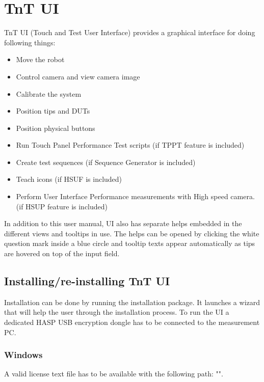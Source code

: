 \chapter{TnT UI}
\label{ch:ui}

TnT UI (Touch and Test User Interface) provides a graphical interface for doing following things:

\begin{itemize}
	\item Move the robot
	\item Control camera and view camera image
	\item Calibrate the system
	\item Position tips and DUTs
	\item Position physical buttons
	\item Run Touch Panel Performance Test scripts (if TPPT feature is included)
	\item Create test sequences (if Sequence Generator is included)
	\item Teach icons (if HSUF is included)
	\item Perform User Interface Performance measurements with High speed camera. (if HSUP feature is included)
\end{itemize}

In addition to this user manual, UI also has separate helps embedded in the different views and tooltips in use. The helps can be opened by clicking the white question mark inside a blue circle and tooltip texts appear automatically as tips are hovered on top of the input field. 

\section{Installing/re-installing TnT UI}
\label{sec:ui_installation}
Installation can be done by running the installation package. It launches a wizard that will help the user through the installation process. To run the UI a dedicated HASP USB encryption dongle has to be connected to the measurement PC. 

\subsection{Windows}
A valid license text file has to be available with the following path: "\tntLicensePath".

